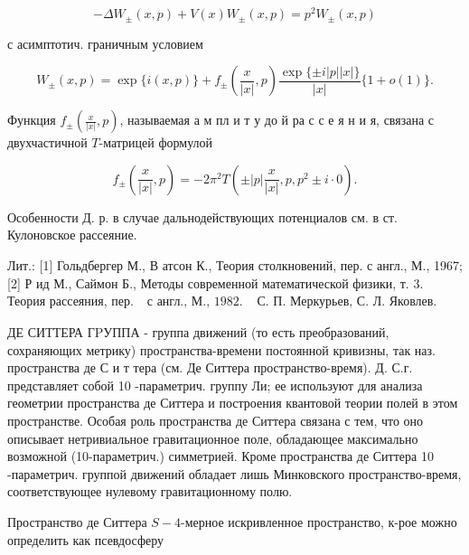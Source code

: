 \documentclass[10pt]{article}
\begin{document}
\[

-\Delta W_{ \pm}(x, p)+V(x) W_{ \pm}(x, p)=p^{2} W_{ \pm}(x, p)

\]



с асимптотич. граничным условием



\[

W_{ \pm}(x, p)=\exp \{i(x, p)\}+f_{ \pm}\left(\frac{x}{|x|}, p\right) \frac{\exp \{ \pm i|p||x|\}}{|x|}\{1+o(1)\} .

\]



Функция $f_{ \pm}\left(\frac{x}{|x|}, p\right)$, называемая а м пл и т у до й ра с с е я н и я, связана с двухчастичной $T$-матрицей формулой



\[

f_{ \pm}\left(\frac{x}{|x|}, p\right)=-2 \pi^{2} T\left( \pm|p| \frac{x}{|x|}, p, p^{2} \pm i \cdot 0\right) .

\]



Особенности Д. р. в случае дальнодействующих потенциалов см. в ст. Кулоновское рассеяние.



Лит.: [1] Гольдбергер М., В атсон К., Теория столкновений, пер. с англ., М., 1967; [2] Р ид М., Саймон Б., Методы современной математической физики, т. 3. Теория рассеяния, пер. $\begin{array}{ll}\text { с англ., М., } 1982 . & \text { С. П. Меркурьев, С. Л. Яковлев. }\end{array}$



ДЕ СИТТЕРА ГPУППА - группа движений (то есть преобразований, сохраняющих метрику) пространства-времени постоянной кривизны, так наз. пространства де С и т тера (см. Де Ситтера пространство-время). Д. С.г. представляет собой 10 -параметрич. группу Ли; ее используют для анализа геометрии пространства де Ситтера и построения квантовой теории полей в этом пространстве. Особая роль пространства де Ситтера связана с тем, что оно описывает нетривиальное гравитационное поле, обладающее максимально возможной (10-параметрич.) симметрией. Кроме пространства де Ситтера 10 -параметрич. группой движений обладает лишь Минковского пространство-время, соответствующее нулевому гравитационному полю.



Пространство де Ситтера $S-4$-мерное искривленное пространство, к-рое можно определить как псевдосферу
\end{document}
